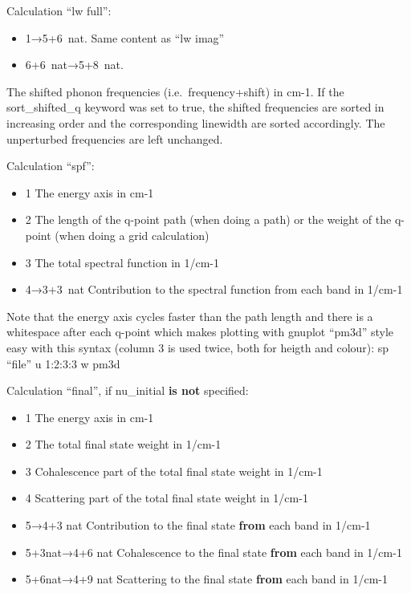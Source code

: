 \documentclass[
]{article}
\providecommand{\tightlist}{%
  \setlength{\itemsep}{0pt}\setlength{\parskip}{0pt}}
\begin{document}
Calculation \enquote{lw full}:

\begin{itemize}
\tightlist
\item
  1→5+6~nat. Same content as \enquote{lw imag}
\item
  6+6~nat→5+8~nat.
\end{itemize}

The shifted phonon frequencies (i.e.~frequency+shift) in cm-1. If the
sort\_shifted\_q keyword was set to true, the shifted frequencies are
sorted in increasing order and the corresponding linewidth are sorted
accordingly. The unperturbed frequencies are left unchanged.

Calculation \enquote{spf}:

\begin{itemize}
\tightlist
\item
  1 The energy axis in cm-1
\item
  2 The length of the q-point path (when doing a path) or the weight of
  the q-point (when doing a grid calculation)
\item
  3 The total spectral function in 1/cm-1
\item
  4→3+3~nat Contribution to the spectral function from each band in
  1/cm-1
\end{itemize}

Note that the energy axis cycles faster than the path length and there
is a whitespace after each q-point which makes plotting with gnuplot
\enquote{pm3d} style easy with this syntax (column 3 is used twice, both
for heigth and colour): sp \enquote{file} u 1:2:3:3 w pm3d

Calculation \enquote{final}, if nu\_initial \textbf{is not} specified:

\begin{itemize}
\tightlist
\item
  1 The energy axis in cm-1
\item
  2 The total final state weight in 1/cm-1
\item
  3 Cohalescence part of the total final state weight in 1/cm-1
\item
  4 Scattering part of the total final state weight in 1/cm-1
\item
  5→4+3 nat Contribution to the final state \textbf{from} each band in
  1/cm-1
\item
  5+3nat→4+6 nat Cohalescence to the final state \textbf{from} each band
  in 1/cm-1
\item
  5+6nat→4+9 nat Scattering to the final state \textbf{from} each band
  in 1/cm-1
\end{itemize}
\end{document}
